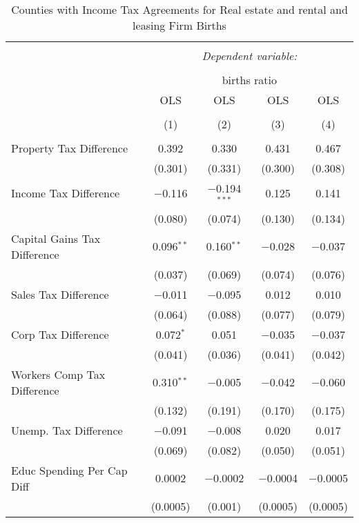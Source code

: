 
\begin{table}[!htbp] \centering 
  \caption{Counties with Income Tax Agreements for  Real estate and rental and leasing Firm Births} 
  \label{53rd} 
\begin{tabular}{@{\extracolsep{5pt}}lcccc} 
\\[-1.8ex]\hline 
\hline \\[-1.8ex] 
 & \multicolumn{4}{c}{\textit{Dependent variable:}} \\ 
\cline{2-5} 
\\[-1.8ex] & \multicolumn{4}{c}{births ratio} \\ 
 & OLS & OLS & OLS & OLS \\ 
\\[-1.8ex] & (1) & (2) & (3) & (4)\\ 
\hline \\[-1.8ex] 
 Property Tax Difference & 0.392 & 0.330 & 0.431 & 0.467 \\ 
  & (0.301) & (0.331) & (0.300) & (0.308) \\ 
  Income Tax Difference & $-$0.116 & $-$0.194$^{***}$ & 0.125 & 0.141 \\ 
  & (0.080) & (0.074) & (0.130) & (0.134) \\ 
  Capital Gains Tax Difference & 0.096$^{**}$ & 0.160$^{**}$ & $-$0.028 & $-$0.037 \\ 
  & (0.037) & (0.069) & (0.074) & (0.076) \\ 
  Sales Tax Difference & $-$0.011 & $-$0.095 & 0.012 & 0.010 \\ 
  & (0.064) & (0.088) & (0.077) & (0.079) \\ 
  Corp Tax Difference & 0.072$^{*}$ & 0.051 & $-$0.035 & $-$0.037 \\ 
  & (0.041) & (0.036) & (0.041) & (0.042) \\ 
  Workers Comp Tax Difference & 0.310$^{**}$ & $-$0.005 & $-$0.042 & $-$0.060 \\ 
  & (0.132) & (0.191) & (0.170) & (0.175) \\ 
  Unemp. Tax Difference & $-$0.091 & $-$0.008 & 0.020 & 0.017 \\ 
  & (0.069) & (0.082) & (0.050) & (0.051) \\ 
  Educ Spending Per Cap Diff & 0.0002 & $-$0.0002 & $-$0.0004 & $-$0.0005 \\ 
  & (0.0005) & (0.001) & (0.0005) & (0.0005) \\ 

\end{tabular}
\end{table}
